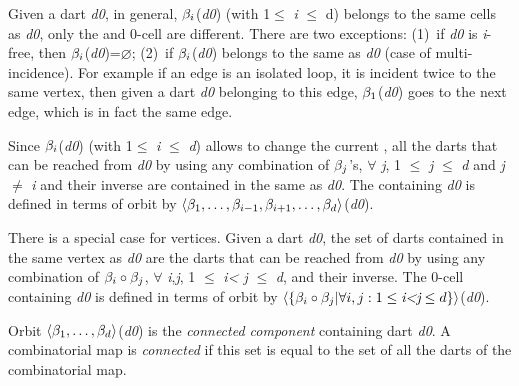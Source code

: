 Given a dart \emph{d0}, in general, $\beta_{i}$(\emph{d0}) (with 1$\leq$ \emph{i} $\leq$ d)
belongs to the same cells as \emph{d0}, only the  and 0-cell are
different.  There are two exceptions: (1)~if \emph{d0} is \emph{i}-free, then
$\beta_{i}$(\emph{d0})=$\varnothing$; (2)~if $\beta_{i}$(\emph{d0}) belongs to the same 
as \emph{d0} (case of multi-incidence). For example if an edge is an isolated
loop, it is incident twice to the same vertex, then given a dart \emph{d0}
belonging to this edge, $\beta_{1}$(\emph{d0}) goes to the next edge, which is in
fact the same edge.

Since $\beta_{i}$(\emph{d0}) (with 1$\leq$ \emph{i} $\leq$ \emph{d}) allows to change the
current , all the darts that can be reached from \emph{d0} by
using any combination of $\beta_{j}$'s, $\forall$ \emph{j}, 1 $\leq$ \emph{j} $\leq$ \emph{d} and
\emph{j}$\neq$ \emph{i} and their inverse are contained in the same  as
\emph{d0}.  The  containing \emph{d0} is defined in terms of orbit by
$\langle{}\beta_1,\ldots,\beta_{i-1},\beta_{i+1},\ldots,\beta_d\rangle{}$(\emph{d0}).


There is a special case for vertices. Given a dart \emph{d0}, the set of
darts contained in the same vertex as \emph{d0} are the darts that can be
reached from \emph{d0} by using any combination of $\beta_{i}\circ\beta_{j}$,
$\forall$ \emph{i},\emph{j}, 1 $\leq$ \emph{i< j} $\leq$ \emph{d}, and their inverse.  The 0-cell
containing \emph{d0} is defined in terms of orbit by
$\langle{}\{\beta_{i}\circ\beta_{j}|\forall i,j: 1\leq \emph{i<j} \leq d\}\rangle{}$(\emph{d0}).



Orbit $\langle{}\beta_1,\ldots,\beta_d\rangle{}$(\emph{d0}) is the \emph{connected
  component} containing dart \emph{d0}. A combinatorial map is
\emph{connected} if this set is equal to the set of all the darts
of the combinatorial map.

%

